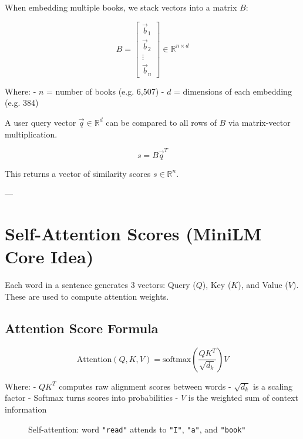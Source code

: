 When embedding multiple books, we stack vectors into a matrix $B$:

\[
B =
\begin{bmatrix}
\vec{b}_1 \\
\vec{b}_2 \\
\vdots \\
\vec{b}_n
\end{bmatrix}
\in \mathbb{R}^{n \times d}
\]

Where:
- $n$ = number of books (e.g. 6,507)
- $d$ = dimensions of each embedding (e.g. 384)

A user query vector $\vec{q} \in \mathbb{R}^d$ can be compared to all rows of $B$ via matrix-vector multiplication.

\[
s = B \vec{q}^T
\]

This returns a vector of similarity scores $s \in \mathbb{R}^n$.

---

\section{Self-Attention Scores (MiniLM Core Idea)}
\label{sec:math-selfattention}

Each word in a sentence generates 3 vectors: Query ($Q$), Key ($K$), and Value ($V$). These are used to compute attention weights.

\subsection*{Attention Score Formula}

\[
\text{Attention}(Q, K, V) = \text{softmax}\left( \frac{QK^T}{\sqrt{d_k}} \right)V
\]

Where:
- $QK^T$ computes raw alignment scores between words
- $\sqrt{d_k}$ is a scaling factor
- Softmax turns scores into probabilities
- $V$ is the weighted sum of context information

\begin{figure}[H]
\centering
{}
\caption{Self-attention: word \texttt{"read"} attends to \texttt{"I"}, \texttt{"a"}, and \texttt{"book"}}
\label{fig:selfattention-math}
\end{figure}


